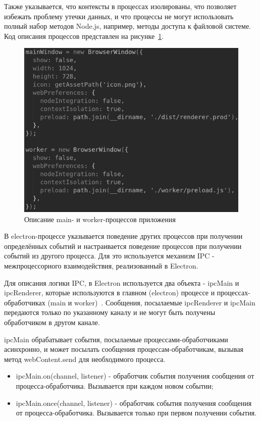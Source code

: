 Также указывается, что контексты в процессах изолированы, что позволяет избежать проблему утечки данных, и что процессы не могут использовать полный набор методов Node.js, например, методы доступа к файловой системе. Код описания процессов представлен на рисунке~\ref{img:mainWorker}.

\begin{figure}[H]
  \centering
  \includegraphics[height=0.3\textheight]{assets/images/practical/main+worker.png}
  \caption{Описание main- и worker-процессов приложения}
  \label{img:mainWorker}
\end{figure}

В electron-процессе указывается поведение других процессов при получении определённых событий и настраивается поведение процессов при получении событий из другого процесса. Для это используется механизм IPC - межпроцессорного взаимодействия, реализованный в Electron.

Для описания логики IPC, в Electron используется два объекта - ipcMain и ipcRenderer, которые используются в главном (electron) процессе и процессах-обработчиках (main и worker)~\cite{electronDocumentation}. Сообщения, посылаемые ipcRenderer и  ipcMain передаются только по указанному каналу и не могут быть получены обработчиком в другом канале.

ipcMain обрабатывает события, посылаемые процессами-обработчиками асинхронно, и может посылать сообщения процессам-обработчикам, вызывая метод webContent.send для необходимого процесса.

\begin{itemize}
  \item ipcMain.on(channel, listener) - обработчик события получения сообщения от процесса-обработчика. Вызывается при каждом новом событии;
  \item ipcMain.once(channel, listener) - обработчик события получения сообщения от процесса-обработчика. Вызывается только при первом получении события.
\end{itemize}

